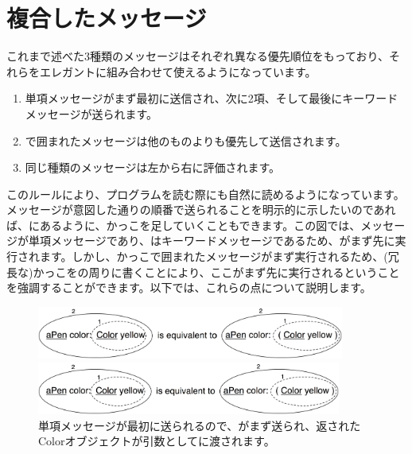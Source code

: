 \documentclass[a4paper,10pt,twoside]{book}
\begin{document}

\section{複合したメッセージ}
これまで述べた3種類のメッセージはそれぞれ異なる優先順位をもっており、それらをエレガントに組み合わせて使えるようになっています。

\begin{enumerate}
\item 単項メッセージがまず最初に送信され、次に2項、そして最後にキーワードメッセージが送られます。
\item {}で囲まれたメッセージは他のものよりも優先して送信されます。
\item 同じ種類のメッセージは左から右に評価されます。
\end{enumerate}

このルールにより、プログラムを読む際にも自然に読めるようになっています。メッセージが意図した通りの順番で送られることを明示的に示したいのであれば、にあるように、かっこを足していくこともできます。この図では、メッセージが単項メッセージであり、はキーワードメッセージであるため、がまず先に実行されます。しかし、かっこで囲まれたメッセージがまず実行されるため、(冗長な)かっこをの周りに書くことにより、ここがまず先に実行されるということを強調することができます。以下では、これらの点について説明します。

\begin{figure}[ht]
\ifluluelse
	{\centerline{\includegraphics[width=0.9\textwidth]{uKeyUn}} }
	{\centerline{\includegraphics[width=10cm]{uKeyUn}} }
\caption{単項メッセージが最初に送られるので、がまず送られ、返されたColorオブジェクトが引数としてに渡されます。}
\end{figure}
\end{document}
